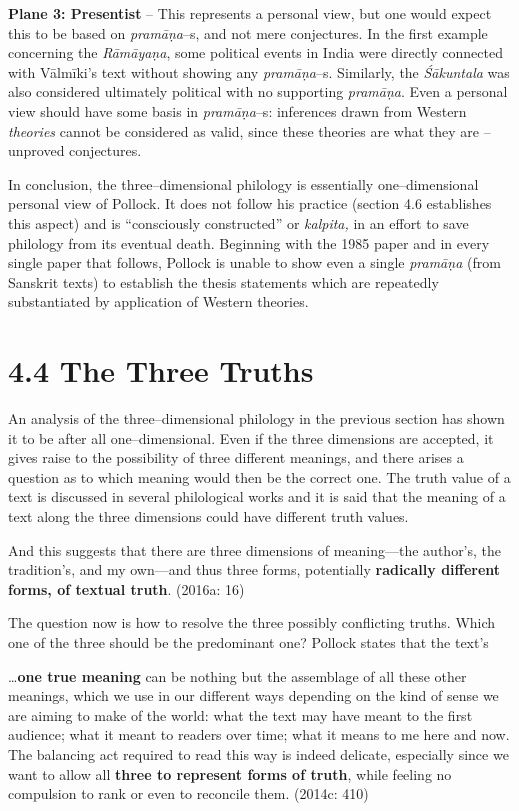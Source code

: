 \textbf{Plane 3: Presentist }– This represents a personal view, but one would expect this to be based on \textit{pramāṇa}–s, and not mere conjectures. In the first example concerning the \textit{Rāmāyaṇa}, some political events in India were directly connected with Vālmīki’s text without showing any \textit{pramāṇa}–s. Similarly, the \textit{Śākuntala }was also considered ultimately political with no supporting \textit{pramāṇa}. Even a personal view should have some basis in \textit{pramāṇa}–s: inferences drawn from Western \textit{theories} cannot be considered as valid, since these theories are what they are – unproved conjectures.

In conclusion, the three–dimensional philology is essentially one–dimensional personal view of Pollock. It does not follow his practice (section 4.6 establishes this aspect) and is “consciously constructed” or \textit{kalpita,} in an effort to save philology from its eventual death. Beginning with the 1985 paper and in every single paper that follows, Pollock is unable to show even a single \textit{pramāṇa }(from Sanskrit texts) to establish the thesis statements which are repeatedly substantiated by application of Western theories.


\section*{4.4 The Three Truths}

An analysis of the three–dimensional philology in the previous section has shown it to be after all one–dimensional. Even if the three dimensions are accepted, it gives raise to the possibility of three different meanings, and there arises a question as to which meaning would then be the correct one. The truth value of a text is discussed in several philological works and it is said that the meaning of a text along the three dimensions could have different truth values.

\begin{myquote}
And this suggests that there are three dimensions of meaning—the author’s, the tradition’s, and my own—and thus three forms, potentially \textbf{radically different forms, of textual truth}. (2016a: 16)
\end{myquote}

The question now is how to resolve the three possibly conflicting truths. Which one of the three should be the predominant one? Pollock states that the text’s

\begin{myquote}
…\textbf{one true meaning} can be nothing but the assemblage of all these other meanings, which we use in our different ways depending on the kind of sense we are aiming to make of the world: what the text may have meant to the first audience; what it meant to readers over time; what it means to me here and now. The balancing act required to read this way is indeed delicate, especially since we want to allow all \textbf{three to represent forms of truth}, while feeling no compulsion to rank or even to reconcile them. (2014c: 410)
\end{myquote}


